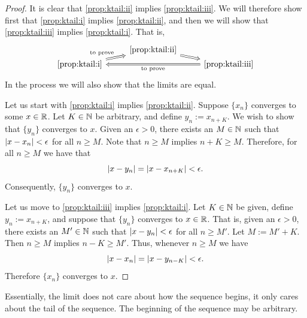 \begin{proof}
It is clear that
\ref{prop:ktail:ii} implies \ref{prop:ktail:iii}.
We will therefore show first that
\ref{prop:ktail:i}
implies
\ref{prop:ktail:ii},
and then we will show that
\ref{prop:ktail:iii}
implies
\ref{prop:ktail:i}.  That is, 
\begin{equation*}
\begin{tikzcd}[row sep=0pt]
& \text{\ref{prop:ktail:ii}} \ar[dr, Rightarrow] & \\
\text{\ref{prop:ktail:i}} \ar[ur, Rightarrow, "\text{to prove}"] & &
\text{\ref{prop:ktail:iii}} \ar[ll, Rightarrow, "\text{to prove}"] 
\end{tikzcd}
\end{equation*}
In the process we will also show that the limits are equal.

Let us start with \ref{prop:ktail:i} implies \ref{prop:ktail:ii}.
Suppose $\{x_n \}$ converges to some $x \in {\mathbb{R}}$.
Let $K \in {\mathbb{N}}$ be arbitrary, and
define $y_n := x_{n+K}$.  We wish to show that $\{ y_n \}$ converges
to $x$.
Given an $\epsilon > 0$, there exists an $M \in {\mathbb{N}}$ such that
$\left\lvert {x-x_n} \right\rvert < \epsilon$ for all $n \geq M$.
Note that $n \geq M$ implies $n+K \geq M$.  Therefore, for
all $n \geq M$ we have that 
\begin{equation*}
\left\lvert {x-y_n} \right\rvert = \left\lvert {x-x_{n+K}} \right\rvert < \epsilon .
\end{equation*}
Consequently, $\{ y_n \}$ converges to $x$.

Let us move to \ref{prop:ktail:iii} implies \ref{prop:ktail:i}.
Let $K \in {\mathbb{N}}$ be given, define
$y_n := x_{n+K}$, and suppose that $\{ y_n \}$ converges to $x \in {\mathbb{R}}$.
That is, given an $\epsilon > 0$, there exists an $M' \in {\mathbb{N}}$ such that
$\left\lvert {x-y_n} \right\rvert < \epsilon$ for all $n \geq M'$.
Let $M := M'+K$.  Then $n \geq M$ implies $n-K \geq M'$.
Thus, whenever $n \geq M$ we have
\begin{equation*}
\left\lvert {x-x_n} \right\rvert = \left\lvert {x-y_{n-K}} \right\rvert < \epsilon.
\end{equation*}
Therefore $\{ x_n \}$ converges to $x$.
\end{proof}

Essentially, the limit does not care about how the sequence begins, it only
cares about the tail of the sequence.  The beginning of the sequence
may be arbitrary.

